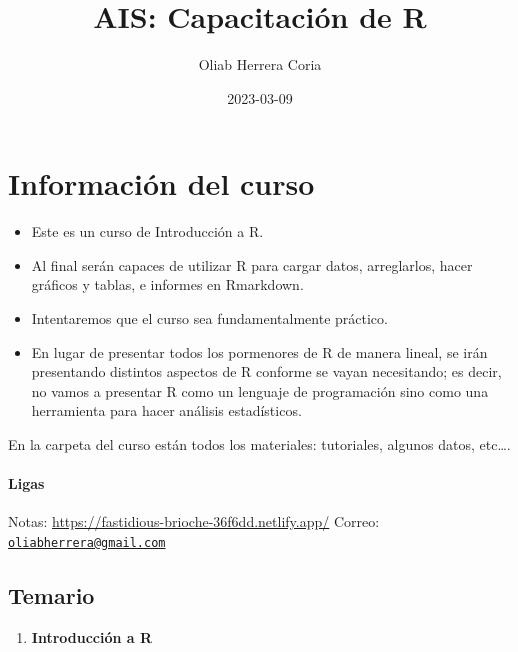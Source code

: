 \documentclass[
]{book}
\title{AIS: Capacitación de R}
\author{Oliab Herrera Coria}
\date{2023-03-09}
\providecommand{\tightlist}{%
  \setlength{\itemsep}{0pt}\setlength{\parskip}{0pt}}
\begin{document}
\maketitle

{
\setcounter{tocdepth}{1}
\tableofcontents
}
\hypertarget{informaciuxf3n-del-curso}{%
\chapter*{Información del curso}\label{informaciuxf3n-del-curso}}

\begin{itemize}
\item
  Este es un curso de Introducción a R.
\item
  Al final serán capaces de utilizar R para cargar datos, arreglarlos, hacer gráficos y tablas, e informes en Rmarkdown.
\item
  Intentaremos que el curso sea fundamentalmente práctico.
\item
  En lugar de presentar todos los pormenores de R de manera lineal, se irán presentando distintos aspectos de R conforme se vayan necesitando; es decir, no vamos a presentar R como un lenguaje de programación sino como una herramienta para hacer análisis estadísticos.
\end{itemize}

En la carpeta del curso están todos los materiales: tutoriales, algunos datos, etc\ldots.

\hypertarget{ligas}{%
\subsubsection*{Ligas}\label{ligas}}

Notas: \url{https://fastidious-brioche-36f6dd.netlify.app/}
Correo: \href{mailto:oliabherrera@gmail.com}{\nolinkurl{oliabherrera@gmail.com}}

\hypertarget{temario}{%
\section*{Temario}\label{temario}}

\begin{enumerate}
\def\labelenumi{\arabic{enumi}.}
\tightlist
\item
  \textbf{Introducción a R}
\end{enumerate}
\end{document}
